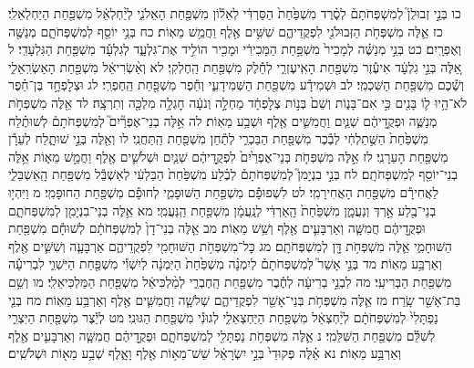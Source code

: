 \documentclass[twoside, openany, parskip=half, 11pt]{book}
\begin{document}
כו בְּנֵ֣י זְבוּלֻן֮ לְמִשְׁפְּחֹתָם֒ לְסֶ֗רֶד מִשְׁפַּ֙חַת֙ הַסַּרְדִּ֔י לְאֵל֕וֹן מִשְׁפַּ֖חַת הָאֵלֹנִ֑י לְיַ֨חְלְאֵ֔ל מִשְׁפַּ֖חַת הַיַּחְלְאֵלִֽי׃ כז אֵ֛לֶּה מִשְׁפְּחֹ֥ת הַזְּבוּלֹנִ֖י לִפְקֻדֵיהֶ֑ם שִׁשִּׁ֥ים אֶ֖לֶף וַחֲמֵ֥שׁ מֵאֽוֹת׃
כח בְּנֵ֥י יוֹסֵ֖ף לְמִשְׁפְּחֹתָ֑ם מְנַשֶּׁ֖ה וְאֶפְרָֽיִם׃ כט בְּנֵ֣י מְנַשֶּׁ֗ה לְמָכִיר֙ מִשְׁפַּ֣חַת הַמָּכִירִ֔י וּמָכִ֖יר הוֹלִ֣יד אֶת־גִּלְעָ֑ד לְגִלְעָ֕ד מִשְׁפַּ֖חַת הַגִּלְעָדִֽי׃ ל אֵ֚לֶּה בְּנֵ֣י גִלְעָ֔ד אִיעֶ֕זֶר מִשְׁפַּ֖חַת הָאִֽיעֶזְרִ֑י לְחֵ֕לֶק מִשְׁפַּ֖חַת הַֽחֶלְקִֽי׃ לא וְאַ֨שְׂרִיאֵ֔ל מִשְׁפַּ֖חַת הָאַשְׂרִֽאֵלִ֑י וְשֶׁ֕כֶם מִשְׁפַּ֖חַת הַשִּׁכְמִֽי׃ לב וּשְׁמִידָ֕ע מִשְׁפַּ֖חַת הַשְּׁמִידָעִ֑י וְחֵ֕פֶר מִשְׁפַּ֖חַת הַֽחֶפְרִֽי׃ לג וּצְלׇפְחָ֣ד בֶּן־חֵ֗פֶר לֹא־הָ֥יוּ ל֛וֹ בָּנִ֖ים כִּ֣י אִם־בָּנ֑וֹת וְשֵׁם֙ בְּנ֣וֹת צְלׇפְחָ֔ד מַחְלָ֣ה וְנֹעָ֔ה חׇגְלָ֥ה מִלְכָּ֖ה וְתִרְצָֽה׃ לד אֵ֖לֶּה מִשְׁפְּחֹ֣ת מְנַשֶּׁ֑ה וּפְקֻ֣דֵיהֶ֔ם שְׁנַ֧יִם וַחֲמִשִּׁ֛ים אֶ֖לֶף וּשְׁבַ֥ע מֵאֽוֹת׃
לה אֵ֣לֶּה בְנֵי־אֶפְרַ֘יִם֮ לְמִשְׁפְּחֹתָם֒ לְשׁוּתֶ֗לַח מִשְׁפַּ֙חַת֙ הַשֻּׁ֣תַלְחִ֔י לְבֶ֕כֶר מִשְׁפַּ֖חַת הַבַּכְרִ֑י לְתַ֕חַן מִשְׁפַּ֖חַת הַֽתַּחֲנִֽי׃ לו וְאֵ֖לֶּה בְּנֵ֣י שׁוּתָ֑לַח לְעֵרָ֕ן מִשְׁפַּ֖חַת הָעֵרָנִֽי׃ לז אֵ֣לֶּה מִשְׁפְּחֹ֤ת בְּנֵי־אֶפְרַ֙יִם֙ לִפְקֻ֣דֵיהֶ֔ם שְׁנַ֧יִם וּשְׁלֹשִׁ֛ים אֶ֖לֶף וַחֲמֵ֣שׁ מֵא֑וֹת אֵ֥לֶּה בְנֵי־יוֹסֵ֖ף לְמִשְׁפְּחֹתָֽם׃
לח בְּנֵ֣י בִנְיָמִן֮ לְמִשְׁפְּחֹתָם֒ לְבֶ֗לַע מִשְׁפַּ֙חַת֙ הַבַּלְעִ֔י לְאַשְׁבֵּ֕ל מִשְׁפַּ֖חַת הָֽאַשְׁבֵּלִ֑י לַאֲחִירָ֕ם מִשְׁפַּ֖חַת הָאֲחִירָמִֽי׃ לט לִשְׁפוּפָ֕ם מִשְׁפַּ֖חַת הַשּׁוּפָמִ֑י לְחוּפָ֕ם מִשְׁפַּ֖חַת הַחוּפָמִֽי׃ מ וַיִּהְי֥וּ בְנֵי־בֶ֖לַע אַ֣רְדְּ וְנַעֲמָ֑ן מִשְׁפַּ֙חַת֙ הָֽאַרְדִּ֔י לְנַֽעֲמָ֔ן מִשְׁפַּ֖חַת הַֽנַּעֲמִֽי׃ מא אֵ֥לֶּה בְנֵי־בִנְיָמִ֖ן לְמִשְׁפְּחֹתָ֑ם וּפְקֻ֣דֵיהֶ֔ם חֲמִשָּׁ֧ה וְאַרְבָּעִ֛ים אֶ֖לֶף וְשֵׁ֥שׁ מֵאֽוֹת׃
מב אֵ֤לֶּה בְנֵי־דָן֙ לְמִשְׁפְּחֹתָ֔ם לְשׁוּחָ֕ם מִשְׁפַּ֖חַת הַשּׁוּחָמִ֑י אֵ֛לֶּה מִשְׁפְּחֹ֥ת דָּ֖ן לְמִשְׁפְּחֹתָֽם׃ מג כׇּל־מִשְׁפְּחֹ֥ת הַשּׁוּחָמִ֖י לִפְקֻדֵיהֶ֑ם אַרְבָּעָ֧ה וְשִׁשִּׁ֛ים אֶ֖לֶף וְאַרְבַּ֥ע מֵאֽוֹת׃
מד בְּנֵ֣י אָשֵׁר֮ לְמִשְׁפְּחֹתָם֒ לְיִמְנָ֗ה מִשְׁפַּ֙חַת֙ הַיִּמְנָ֔ה לְיִשְׁוִ֕י מִשְׁפַּ֖חַת הַיִּשְׁוִ֑י לִבְרִיעָ֕ה מִשְׁפַּ֖חַת הַבְּרִיעִֽי׃ מה לִבְנֵ֣י בְרִיעָ֔ה לְחֶ֕בֶר מִשְׁפַּ֖חַת הַֽחֶבְרִ֑י לְמַ֨לְכִּיאֵ֔ל מִשְׁפַּ֖חַת הַמַּלְכִּיאֵלִֽי׃ מו וְשֵׁ֥ם בַּת־אָשֵׁ֖ר שָֽׂרַח׃ מז אֵ֛לֶּה מִשְׁפְּחֹ֥ת בְּנֵי־אָשֵׁ֖ר לִפְקֻדֵיהֶ֑ם שְׁלֹשָׁ֧ה וַחֲמִשִּׁ֛ים אֶ֖לֶף וְאַרְבַּ֥ע מֵאֽוֹת׃
מח בְּנֵ֤י נַפְתָּלִי֙ לְמִשְׁפְּחֹתָ֔ם לְיַ֨חְצְאֵ֔ל מִשְׁפַּ֖חַת הַיַּחְצְאֵלִ֑י לְגוּנִ֕י מִשְׁפַּ֖חַת הַגּוּנִֽי׃ מט לְיֵ֕צֶר מִשְׁפַּ֖חַת הַיִּצְרִ֑י לְשִׁלֵּ֕ם מִשְׁפַּ֖חַת הַשִּׁלֵּמִֽי׃ נ אֵ֛לֶּה מִשְׁפְּחֹ֥ת נַפְתָּלִ֖י לְמִשְׁפְּחֹתָ֑ם וּפְקֻ֣דֵיהֶ֔ם חֲמִשָּׁ֧ה וְאַרְבָּעִ֛ים אֶ֖לֶף וְאַרְבַּ֥ע מֵאֽוֹת׃ נא אֵ֗לֶּה פְּקוּדֵי֙ בְּנֵ֣י יִשְׂרָאֵ֔ל שֵׁשׁ־מֵא֥וֹת אֶ֖לֶף וָאָ֑לֶף שְׁבַ֥ע מֵא֖וֹת וּשְׁלֹשִֽׁים׃
\end{document}
